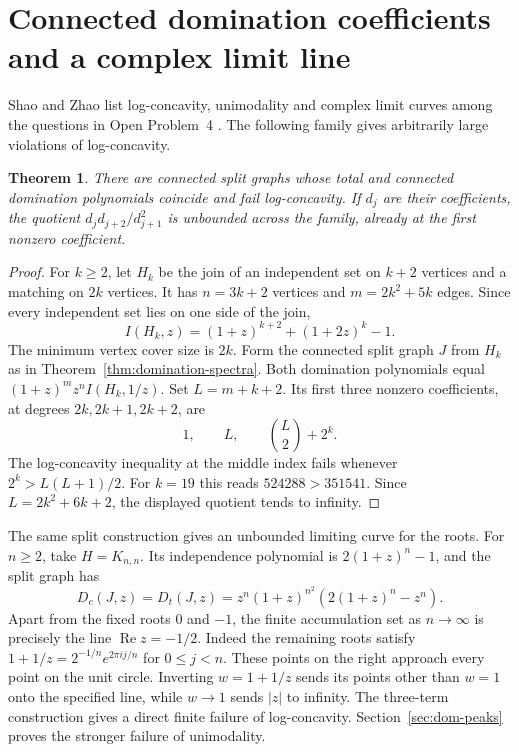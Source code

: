 \documentclass[11pt,a4paper]{article}
\newtheorem{theorem}{Theorem}[section]
\begin{document}
\section{Connected domination coefficients and a complex limit line}
\label{sec:connected-shape}

Shao and Zhao list log-concavity, unimodality and complex limit curves
among the questions in Open Problem~4 \cite[Section~5.2]{shao}. The
following family gives arbitrarily large violations of log-concavity.

\begin{theorem}\label{thm:domination-logconcavity}
There are connected split graphs whose total and connected domination
polynomials coincide and fail log-concavity. If $d_j$ are their
coefficients, the quotient $d_jd_{j+2}/d_{j+1}^2$ is unbounded across
the family, already at the first nonzero coefficient.
\end{theorem}
\begin{proof}
For $k\ge2$, let $H_k$ be the join of an independent set on $k+2$
vertices and a matching on $2k$ vertices. It has $n=3k+2$ vertices
and $m=2k^2+5k$ edges. Since every independent set lies on one side
of the join,
\[
 I(H_k,z)=(1+z)^{k+2}+(1+2z)^k-1.
\]
The minimum vertex cover size is $2k$. Form the connected split graph
$J$ from $H_k$ as in Theorem~\ref{thm:domination-spectra}. Both
domination polynomials equal $(1+z)^m z^n I(H_k,1/z)$. Set
$L=m+k+2$. Its first three nonzero coefficients, at degrees
$2k,2k+1,2k+2$, are
\[
 1,\qquad L,\qquad \binom{L}{2}+2^k.
\]
The log-concavity inequality at the middle index fails whenever
$2^k>L(L+1)/2$. For $k=19$ this reads $524288>351541$.
Since $L=2k^2+6k+2$, the displayed quotient tends to infinity.
\end{proof}

The same split construction gives an unbounded limiting curve for the
roots. For $n\ge2$, take $H=K_{n,n}$. Its independence polynomial is
$2(1+z)^n-1$, and the split graph has
\[
 D_c(J,z)=D_t(J,z)=z^n(1+z)^{n^2}
                  \left(2(1+z)^n-z^n\right).
\]
Apart from the fixed roots $0$ and $-1$, the finite accumulation set as
$n\to\infty$ is precisely the line $\operatorname{Re}z=-1/2$.
Indeed the remaining roots satisfy $1+1/z=2^{-1/n}e^{2\pi i j/n}$
for $0\le j<n$. These points on the right approach every point on
the unit circle. Inverting $w=1+1/z$ sends its points other than
$w=1$ onto the specified line, while $w\to1$ sends $|z|$ to infinity.
The three-term construction gives a direct finite failure of log-concavity. Section~\ref{sec:dom-peaks} proves the stronger failure of unimodality.
\end{document}
